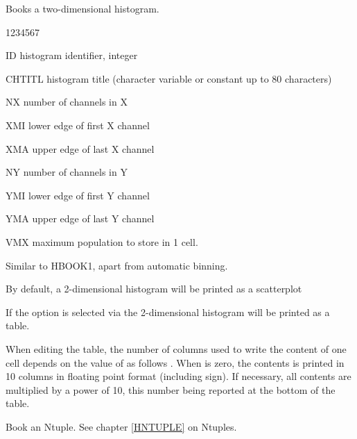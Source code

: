 \Action Books a two-dimensional histogram.
\Pdesc\begin{DLtt}{1234567}
\item[ID] histogram identifier, integer
\item[CHTITL]histogram title  (character variable or constant up to 80
characters)
\item[NX] number of channels in X
\item[XMI] lower edge of first X channel
\item[XMA] upper edge of last X channel
\item[NY] number of channels in Y
\item[YMI] lower edge of first Y channel
\item[YMA] upper edge of last Y channel
\item[VMX] maximum population to store in 1 cell.
\end{DLtt}
\Remark
\begin{UL}
\item Similar to HBOOK1, apart from automatic binning.
\item By default, a 2-dimensional histogram will be
printed as a scatterplot
\item If the option  is selected via
the 2-dimensional histogram will be printed as a table.
\item When editing the table, the number of columns  used to
write the content of one cell depends on the value of 
as follows .
When  is zero,
the contents is printed in
10 columns in floating point format (including sign). If
necessary, all contents are multiplied by a power of 10,
this number being reported at the bottom of the table.
\end{UL}
\Action Book an Ntuple. See chapter \ref{HNTUPLE} on Ntuples.
